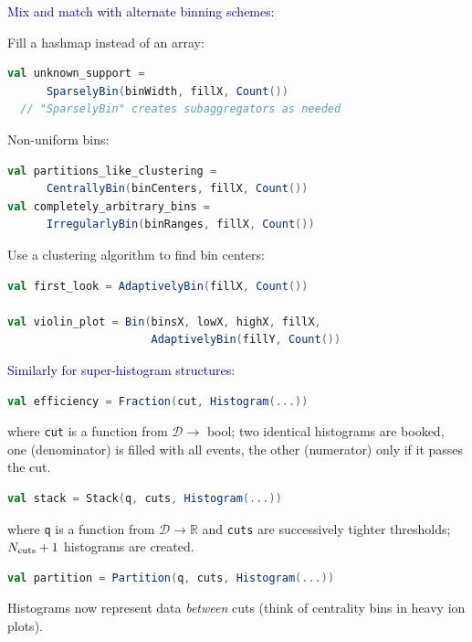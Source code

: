 \documentclass{beamer}
\begin{document}
\begin{frame}[fragile]{}
\textcolor{darkblue}{\large Mix and match with alternate binning schemes:}

\vspace{0.5 cm}
Fill a hashmap instead of an array:
\begin{lstlisting}[language=scala]
val unknown_support =
      SparselyBin(binWidth, fillX, Count())
  // "SparselyBin" creates subaggregators as needed
\end{lstlisting}

Non-uniform bins:
\begin{lstlisting}[language=scala]
val partitions_like_clustering =
      CentrallyBin(binCenters, fillX, Count())
val completely_arbitrary_bins =
      IrregularlyBin(binRanges, fillX, Count())
\end{lstlisting}

Use a clustering algorithm to find bin centers:
\begin{lstlisting}[language=scala]
val first_look = AdaptivelyBin(fillX, Count())

val violin_plot = Bin(binsX, lowX, highX, fillX,
                      AdaptivelyBin(fillY, Count())
\end{lstlisting}
\end{frame}

\begin{frame}[fragile]{}
\textcolor{darkblue}{\large Similarly for super-histogram structures:}

\vspace{0.5 cm}
\begin{lstlisting}[language=scala]
val efficiency = Fraction(cut, Histogram(...))
\end{lstlisting}
where {\tt \small cut} is a function from $\mathcal{D} \to$ bool; two identical histograms are booked, one (denominator) is filled with all events, the other (numerator) only if it passes the cut.

\vfill
\begin{lstlisting}[language=scala]
val stack = Stack(q, cuts, Histogram(...))
\end{lstlisting}
where {\tt \small q} is a function from $\mathcal{D} \to \mathbb{R}$ and {\tt \small cuts} are successively tighter thresholds; $N_{\mbox{\scriptsize cuts}} + 1$ histograms are created.

\vfill
\begin{lstlisting}[language=scala]
val partition = Partition(q, cuts, Histogram(...))
\end{lstlisting}
Histograms now represent data {\it between} cuts (think of centrality bins in heavy ion plots).
\end{frame}
\end{document}
